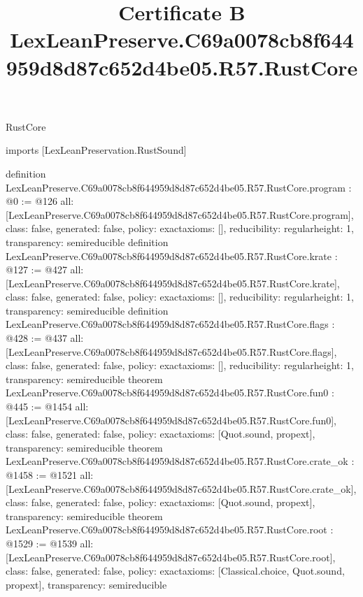 \begin{lexlean}{RustCore}
\title{Certificate B LexLeanPreserve.C69a0078cb8f644959d8d87c652d4be05.R57.RustCore}
\begin{coremodule}
imports [LexLeanPreservation.RustSound]

definition LexLeanPreserve.C69a0078cb8f644959d8d87c652d4be05.R57.RustCore.program : @0 := @126 {
  all: [LexLeanPreserve.C69a0078cb8f644959d8d87c652d4be05.R57.RustCore.program],
  class: false,
  generated: false,
  policy: exact{axioms: []},
  reducibility: regular{height: 1},
  transparency: semireducible
}
definition LexLeanPreserve.C69a0078cb8f644959d8d87c652d4be05.R57.RustCore.krate : @127 := @427 {
  all: [LexLeanPreserve.C69a0078cb8f644959d8d87c652d4be05.R57.RustCore.krate],
  class: false,
  generated: false,
  policy: exact{axioms: []},
  reducibility: regular{height: 1},
  transparency: semireducible
}
definition LexLeanPreserve.C69a0078cb8f644959d8d87c652d4be05.R57.RustCore.flags : @428 := @437 {
  all: [LexLeanPreserve.C69a0078cb8f644959d8d87c652d4be05.R57.RustCore.flags],
  class: false,
  generated: false,
  policy: exact{axioms: []},
  reducibility: regular{height: 1},
  transparency: semireducible
}
theorem LexLeanPreserve.C69a0078cb8f644959d8d87c652d4be05.R57.RustCore.fun0 : @445 := @1454 {
  all: [LexLeanPreserve.C69a0078cb8f644959d8d87c652d4be05.R57.RustCore.fun0],
  class: false,
  generated: false,
  policy: exact{axioms: [Quot.sound, propext]},
  transparency: semireducible
}
theorem LexLeanPreserve.C69a0078cb8f644959d8d87c652d4be05.R57.RustCore.crate_ok : @1458 := @1521 {
  all: [LexLeanPreserve.C69a0078cb8f644959d8d87c652d4be05.R57.RustCore.crate_ok],
  class: false,
  generated: false,
  policy: exact{axioms: [Quot.sound, propext]},
  transparency: semireducible
}
theorem LexLeanPreserve.C69a0078cb8f644959d8d87c652d4be05.R57.RustCore.root : @1529 := @1539 {
  all: [LexLeanPreserve.C69a0078cb8f644959d8d87c652d4be05.R57.RustCore.root],
  class: false,
  generated: false,
  policy: exact{axioms: [Classical.choice, Quot.sound, propext]},
  transparency: semireducible
}


\end{coremodule}
\end{lexlean}
